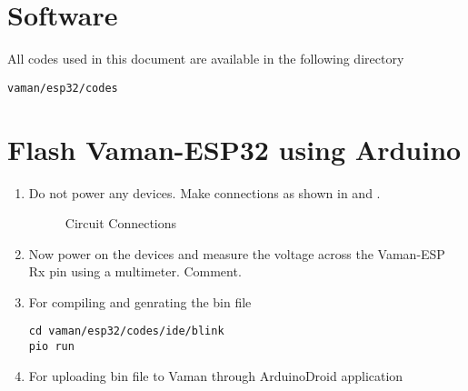 \documentclass[12pt]{article}
\begin{document}
\fi

\section{Software}
%
All codes used in this document are available in the following directory 
\begin{lstlisting}
vaman/esp32/codes
\end{lstlisting}
\section{Flash Vaman-ESP32 using Arduino}

\renewcommand{\theequation}{\theenumi}
\renewcommand{\thefigure}{\theenumi}
\begin{enumerate}[label=\thesection.\arabic*.,ref=\thesection.\theenumi]
\item Do not power any devices.  Make connections as shown in  and 
.
			\begin{table}[!h]
		
		\caption{}
		\label{tab:vaman/uart/rpi-vaman-uart}
	\end{table}
\begin{figure}
\centering

\caption{Circuit Connections}
\label{fig:vaman/uart/1}
\end{figure}
\item Now power on the devices and measure the voltage across the Vaman-ESP Rx pin using a multimeter.  Comment.
\iffalse
\item Modify your platformio.ini file by adding the lines
\begin{lstlisting}
upload_protocol = esptool
upload_port = /dev/ttyACM0
upload_speed = 115200
\end{lstlisting}
\fi
\item For compiling and genrating the bin file 
\begin{lstlisting}
cd vaman/esp32/codes/ide/blink
pio run
\end{lstlisting}
\item For uploading bin file to Vaman through ArduinoDroid application 

\end{enumerate}
\end{document}
